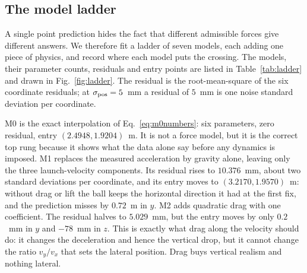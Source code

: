 \subsection{The model ladder}
\label{sec:ladder}

A single point prediction hides the fact that different admissible forces give
different answers. We therefore fit a ladder of seven models, each adding one
piece of physics, and record where each model puts the crossing. The models,
their parameter counts, residuals and entry points are listed in
Table~\ref{tab:ladder} and drawn in Fig.~\ref{fig:ladder}. The residual is the
root-mean-square of the six coordinate residuals; at $\sigma_{\rm pos}=5$~mm a
residual of $5$~mm is one noise standard deviation per coordinate.

M0 is the exact interpolation of Eq.~\eqref{eq:m0numbers}: six parameters, zero
residual, entry $(2.4948,1.9204)$~m. It is not a force model, but it is the
correct top rung because it shows what the data alone say before any dynamics is
imposed. M1 replaces the measured acceleration by gravity alone, leaving only the
three launch-velocity components. Its residual rises to $10.376$~mm, about two
standard deviations per coordinate, and its entry moves to
$(3.2170,1.9570)$~m: without drag or lift the ball keeps the horizontal direction
it had at the first fix, and the prediction misses by $0.72$~m in $y$. M2 adds
quadratic drag with one coefficient. The residual halves to $5.029$~mm, but the
entry moves by only $0.2$~mm in $y$ and $-78$~mm in $z$. This is exactly what
drag along the velocity should do: it changes the deceleration and hence the
vertical drop, but it cannot change the ratio $v_y/v_x$ that sets the lateral
position. Drag buys vertical realism and nothing lateral.

